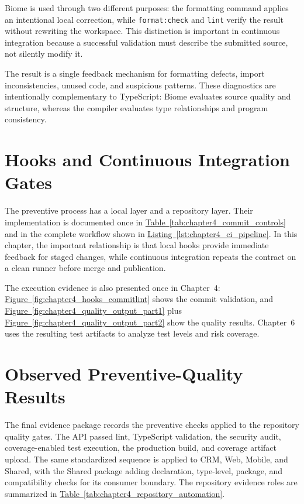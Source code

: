 \documentclass[letterpaper%
, oneside%
, 12pt%
, memoireprojet%
, english%
,creativecommons,hyperref, withAlgo2e %
]{thETS}
\begin{document}
Biome is used through two different purposes: the formatting command applies an intentional local
correction, while \texttt{format:check} and \texttt{lint} verify the result without rewriting the
workspace. This distinction is important in continuous integration because a successful validation
must describe the submitted source, not silently modify it.

The result is a single feedback mechanism for formatting defects, import inconsistencies, unused
code, and suspicious patterns. These diagnostics are intentionally complementary to TypeScript:
Biome evaluates source quality and structure, whereas the compiler evaluates type relationships and
program consistency.

\section{Hooks and Continuous Integration Gates}
The preventive process has a local layer and a repository layer. Their implementation is documented
once in \hyperref[tab:chapter4_commit_controls]{Table~\ref*{tab:chapter4_commit_controls}} and in
the complete workflow shown in
\hyperref[lst:chapter4_ci_pipeline]{Listing~\ref*{lst:chapter4_ci_pipeline}}. In this chapter,
the important relationship is that local hooks provide immediate feedback for staged changes, while
continuous integration repeats the contract on a clean runner before merge and publication.

The execution evidence is also presented once in Chapter~4:
\hyperref[fig:chapter4_hooks_commitlint]{Figure~\ref*{fig:chapter4_hooks_commitlint}} shows the
commit validation, and
\hyperref[fig:chapter4_quality_output_part1]{Figure~\ref*{fig:chapter4_quality_output_part1}} plus
\hyperref[fig:chapter4_quality_output_part2]{Figure~\ref*{fig:chapter4_quality_output_part2}} show
the quality results. Chapter~6 uses the resulting test artifacts to analyze test levels and risk
coverage.

\section{Observed Preventive-Quality Results}
The final evidence package records the preventive checks applied to the repository quality gates.
The API passed lint, TypeScript validation, the security audit, coverage-enabled test execution,
the production build, and coverage artifact upload. The same standardized sequence is applied to
CRM, Web, Mobile, and Shared, with the Shared package adding
declaration, type-level, package, and compatibility checks for its consumer boundary. The repository
evidence roles are summarized in
\hyperref[tab:chapter4_repository_automation]{Table~\ref*{tab:chapter4_repository_automation}}.
\end{document}
